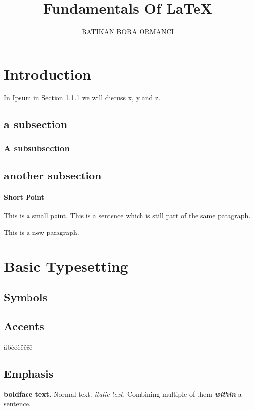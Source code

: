 \documentclass[a4paper, twocolumn]{article}
\title{Fundamentals Of \LaTeX}
\author{BATIKAN BORA ORMANCI}
\begin{document}
\maketitle	

\begin{abstract}
	\lipsum[1]
\end{abstract}

\tableofcontents

\section{Introduction}
In Ipsum in Section \ref{sec:ipsum} we will discuss x, y and z. 
\subsection{a subsection}
\lipsum
\subsubsection{A subsubsection}\label{sec:ipsum}

\subsection{another subsection}
\lipsum[1]

\paragraph{Short Point}
This is a small point. This is 
a sentence which is still part of the same paragraph. 

This is a new paragraph. 

\section{Basic Typesetting}
\subsection{Symbols}
\EUR \EURhv

\subsection{Accents}
\"{a}\H{b}\.{c}\'{e}\`{e}\^{e}\v{e}\u{e}\={e}

\subsection{Emphasis}
\textbf{boldface text.}
Normal text.
\textit{italic text.}
Combining multiple of them \textbf{\textit{within}} a sentence. 
\end{document}
